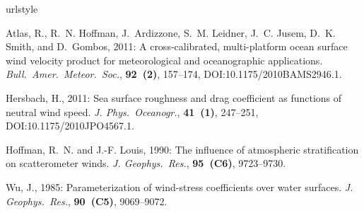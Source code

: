 \documentclass[12pt,notitlepage]{article}
\begin{document}

\normalspacing

% 
% 

\begin{thebibliography}{4}
\providecommand{\natexlab}[1]{#1}
\providecommand{\url}[1]{\texttt{#1}}
\providecommand{\urlprefix}{URL }
\expandafter\ifx\csname urlstyle\endcsname\relax
  \providecommand{\doi}[1]{doi:\discretionary{}{}{}#1}\else
  \providecommand{\doi}{doi:\discretionary{}{}{}\begingroup
  \urlstyle{rm}\Url}\fi
\providecommand{\eprint}[2][]{\url{#2}}

Atlas, R., R.~N. Hoffman, J.~Ardizzone, S.~M. Leidner, J.~C. Jusem, D.~K.
  Smith, and D.~Gombos, 2011: A cross-calibrated, multi-platform ocean surface
  wind velocity product for meteorological and oceanographic applications.
  \textit{Bull.\ Amer.\ Meteor.\ Soc.}, \textbf{92~(2)}, 157--174,
  {DOI}:10.1175/2010BAMS2946.1.

Hersbach, H., 2011: Sea surface roughness and drag coefficient as functions of
  neutral wind speed. \textit{J. Phys.\ Oceanogr.}, \textbf{41~(1)}, 247--251,
  {DOI}:10.1175/2010JPO4567.1.

Hoffman, R.~N. and J.-F. Louis, 1990: The influence of atmospheric
  stratification on scatterometer winds. \textit{J. Geophys.\ Res.},
  \textbf{95~(C6)}, 9723--9730.

Wu, J., 1985: Parameterization of wind-stress coefficients over water surfaces.
  \textit{J. Geophys.\ Res.}, \textbf{90~(C5)}, 9069--9072.

\end{thebibliography}
\end{document}
